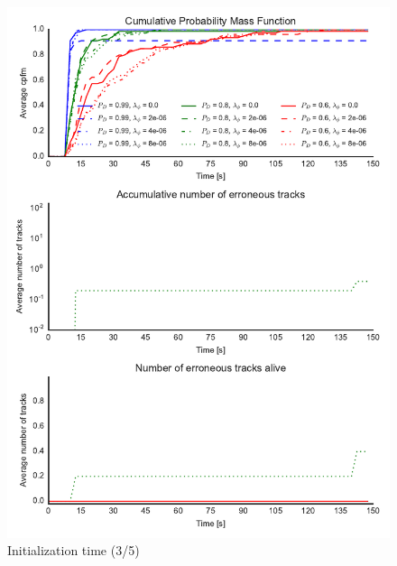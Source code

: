 \begin{figure}
\centering
\includegraphics{Figures/plots/Scenario0_Init-Time(3-5).pdf}
\caption{Initialization time (3/5)}\label{fig:init_time_3-5}
\end{figure}

